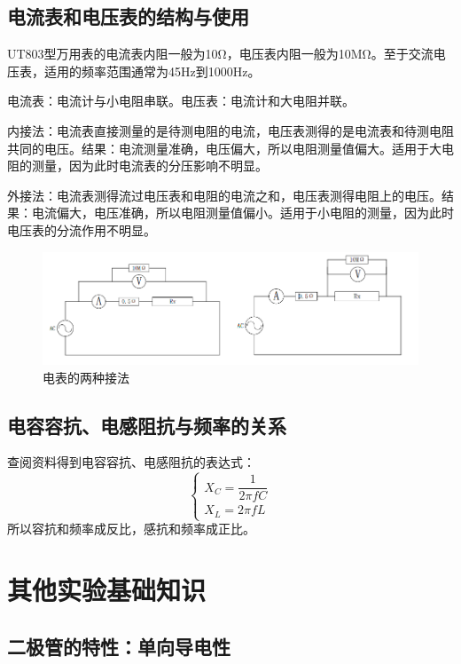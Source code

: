 \documentclass{ctexart}
\begin{document}
\subsection{电流表和电压表的结构与使用}
UT803型万用表的电流表内阻一般为10Ω，电压表内阻一般为10MΩ。至于交流电压表，适用的频率范围通常为45Hz到1000Hz。

电流表：电流计与小电阻串联。电压表：电流计和大电阻并联。

内接法：电流表直接测量的是待测电阻的电流，电压表测得的是电流表和待测电阻共同的电压。结果：电流测量准确，电压偏大，所以电阻测量值偏大。适用于大电阻的测量，因为此时电流表的分压影响不明显。

外接法：电流表测得流过电压表和电阻的电流之和，电压表测得电阻上的电压。结果：电流偏大，电压准确，所以电阻测量值偏小。适用于小电阻的测量，因为此时电压表的分流作用不明显。
\begin{figure}[!ht]\label{电表的两种接法}
    \centering
    \includegraphics[scale=0.7]{./pictures/电流表的两种接法.png}
    \caption{电表的两种接法}
    
\end{figure}
\subsection{电容容抗、电感阻抗与频率的关系}
查阅资料得到电容容抗、电感阻抗的表达式：
\begin{equation}
    \begin{cases}
        X_C= \dfrac{1}{2 \pi f C}\\
        X_L = 2 \pi f L
    \end{cases}
\end{equation}
所以容抗和频率成反比，感抗和频率成正比。



\section{其他实验基础知识}\subsection{二极管的特性：单向导电性}
\end{document}
